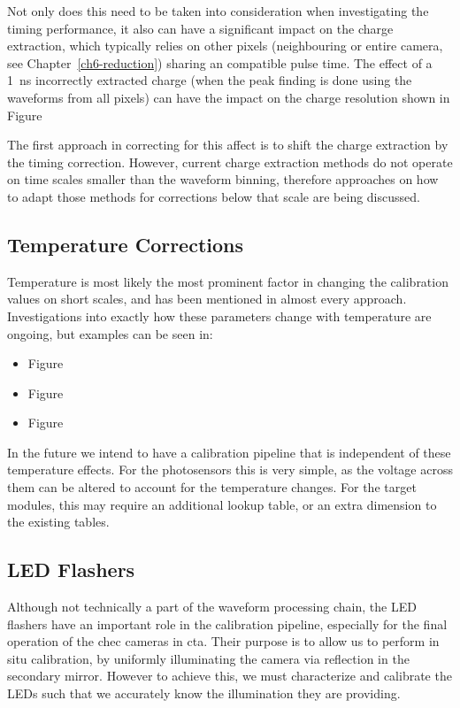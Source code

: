 Not only does this need to be taken into consideration when investigating the timing performance, it also can have a significant impact on the charge extraction, which typically relies on other pixels (neighbouring or entire camera, see Chapter~\ref{ch6-reduction}) sharing an compatible pulse time. The effect of a 1~ns incorrectly extracted charge (when the peak finding is done using the waveforms from all pixels) can have the impact on the charge resolution shown in Figure~

The first approach in correcting for this affect is to shift the charge extraction by the timing correction. However, current charge extraction methods do not operate on time scales smaller than the waveform binning, therefore approaches on how to adapt those methods for corrections below that scale are being discussed.

\subsection{\label{temperature_corrections}Temperature Corrections}

Temperature is most likely the most prominent factor in changing the calibration values on short scales, and has been mentioned in almost every approach. Investigations into exactly how these parameters change with temperature are ongoing, but examples can be seen in:
\begin{itemize}
	\item Figure~
	\item Figure~
	\item Figure~
\end{itemize}
In the future we intend to have a calibration pipeline that is independent of these temperature effects. For the photosensors this is very simple, as the voltage across them can be altered to account for the temperature changes. For the \gls{target} modules, this may require an additional lookup table, or an extra dimension to the existing tables.

\subsection{LED Flashers}

Although not technically a part of the waveform processing chain, the LED flashers have an important role in the calibration pipeline, especially for the final operation of the \gls{chec} cameras in \gls{cta}. Their purpose is to allow us to perform in situ calibration, by uniformly illuminating the camera via reflection in the secondary mirror. However to achieve this, we must characterize and calibrate the LEDs such that we accurately know the illumination they are providing. 

